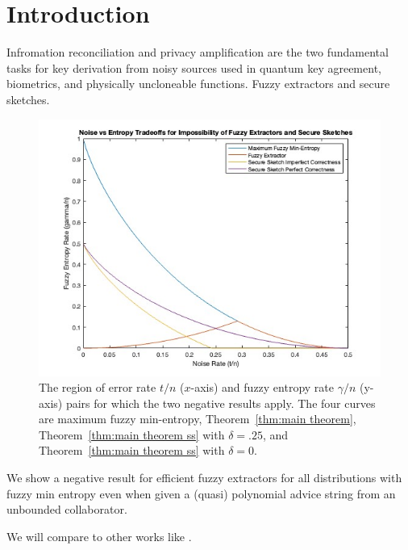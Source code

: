 
\section{Introduction}
Infromation reconciliation and privacy amplification are the two fundamental tasks for key derivation from noisy sources used in quantum key agreement, biometrics, and physically uncloneable functions. 
Fuzzy extractors and secure sketches. 

\begin{figure}[t]
\centering
\includegraphics[width=.8\textwidth]{EntropyvsError.jpg}
\caption{The region of error rate $t/n$ ($x$-axis) and fuzzy entropy rate $\gamma/n$ (y-axis) pairs for which the two negative results apply.  The four curves are maximum fuzzy min-entropy, Theorem~\ref{thm:main theorem}, Theorem~\ref{thm:main theorem ss} with $\delta=.25$, and Theorem~\ref{thm:main theorem ss} with $\delta =0$.}
\end{figure}
We show a negative result for efficient fuzzy extractors for all distributions with fuzzy min entropy even when given a (quasi) polynomial advice string from an unbounded collaborator. 

We will compare to other works like \cite{fuller2016fuzzy,fuller2019continuous,fuller2020fuzzy}. 